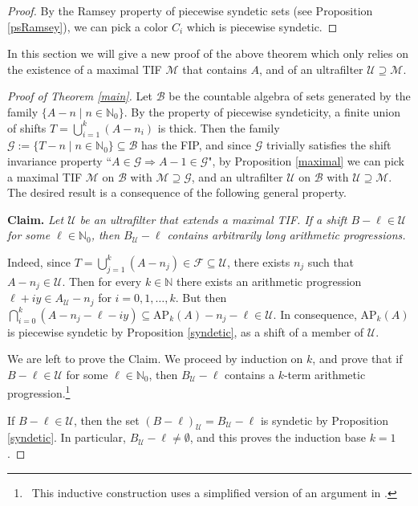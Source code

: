 \documentclass[10pt]{amsart}
\theoremstyle{definition}
\theoremstyle{remark}
\def\N{\mathbb{N}}
\def\B{\mathcal{B}}
\def\F{\mathcal{F}}
\def\G{\mathcal{G}}
\def\U{\mathcal{U}}
\begin{document}
\begin{proof}
By the Ramsey property of piecewise syndetic sets 
(see Proposition \ref{psRamsey}),
we can pick a color $C_i$ which is piecewise syndetic.
\end{proof}

In this section we will give a new proof of the above theorem
which only relies on the existence of a maximal
TIF $\mathcal{M}$ that contains $A$, and of an ultrafilter $\U\supseteq\mathcal{M}$.

\begin{proof}[Proof of Theorem \ref{main}]
Let $\mathcal{B}$ be the countable algebra of sets
generated by the family $\{A-n\mid n\in\N_0\}$.
By the property of piecewise syndeticity, 
a finite union of shifts $T=\bigcup_{i=1}^k(A-n_i)$ is thick.
Then the family $\G:=\{T-n\mid n\in\N_0\}\subseteq\B$ has the FIP,
and since $\G$ trivially satisfies the shift invariance
property ``$A\in\G\Rightarrow A-1\in\G$", by Proposition \ref{maximal}
we can pick a maximal TIF $\mathcal{M}$ on $\B$ with $\mathcal{M}\supseteq\G$,
and an ultrafilter $\U$ on $\B$ with $\U\supseteq\mathcal{M}$.
The desired result is a consequence of the following general property.

\smallskip
\textbf{Claim.}
\emph{Let $\U$ be an ultrafilter that extends a maximal TIF.
If a shift $B-\ell\in\U$ for some $\ell\in\N_0$,
then $B_\U-\ell$ contains arbitrarily long arithmetic progressions.}

\smallskip
Indeed, since $T=\bigcup_{j=1}^k(A-n_j)\in\F\subseteq\U$, there
exists $n_j$ such that $A-n_j\in\U$.
Then for every $k\in\N$ there
exists an arithmetic progression $\ell+i y\in A_\U-n_j$ for $i=0,1,\ldots,k$.
But then $\bigcap_{i=0}^k(A-n_j-\ell-iy)\subseteq\text{AP}_k(A)-n_j-\ell\in\U$.
In consequence, $\text{AP}_k(A)$ is piecewise syndetic by Proposition \ref{syndetic}, 
as a shift of a member of $\U$.

\smallskip
We are left to prove the Claim.
We proceed by induction on $k$, and prove that if $B-\ell\in\U$ for some 
$\ell\in\N_0$, then $B_\U-\ell$ contains a $k$-term arithmetic progression.\footnote
{~This inductive construction uses a simplified version of an argument 
in \cite{h}.}

If $B-\ell\in\U$, then the set $(B-\ell)_\U=B_\U-\ell$ is syndetic by Proposition \ref{syndetic}.
In particular, $B_\U-\ell\ne\emptyset$, and this proves the induction base $k=1$.


\end{proof}
\end{document}
